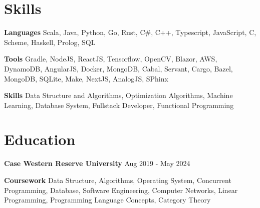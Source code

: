 \documentclass[11pt]{article}
\begin{document}
\section{Skills}
    \hspace{10pt}\textbf{Languages} {\small Scala, Java, Python, Go, Rust, C\#, C++, Typescript, JavaScript, C, Scheme, Haskell, Prolog, SQL}

    \hspace{10pt}\textbf{Tools} {\small Gradle, NodeJS, ReactJS, Tensorflow, OpenCV, Blazor, AWS, DynamoDB, AngularJS, Docker, MongoDB, Cabal, Servant, Cargo, Bazel, MongoDB, SQLite, Make, NextJS, AnalogJS, SPhinx}

    \hspace{10pt}\textbf{Skills} {\small Data Structure and Algorithms, Optimization Algorithms, Machine Learning, Database System, Fullstack Developer, Functional Programming}
    \vspace{-10pt}
      
\section{Education}
    \hspace{10pt}\textbf{Case Western Reserve University} \hfill {\small Aug 2019 - May 2024}\\

    \hspace{10pt}\textbf{Coursework} {\small Data Structure, Algorithms, Operating System, Concurrent Programming, Database, Software Engineering, Computer Networks, Linear Programming, Programming Language Concepts, Category Theory}
\end{document}
